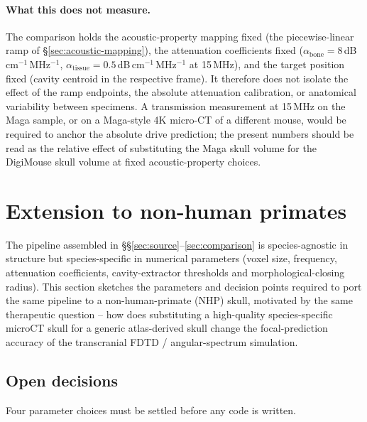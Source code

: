 \documentclass{compactarticle}
\begin{document}
\paragraph{What this does not measure.} The comparison holds the
acoustic-property mapping fixed (the piecewise-linear ramp of
\S\ref{sec:acoustic-mapping}), the attenuation coefficients fixed
($\alpha_{\mathrm{bone}} = 8$\,dB\,cm$^{-1}$\,MHz$^{-1}$,
$\alpha_{\mathrm{tissue}} = 0.5$\,dB\,cm$^{-1}$\,MHz$^{-1}$ at
15\,MHz), and the target position fixed (cavity centroid in the
respective frame). It therefore does not isolate the effect of the
ramp endpoints, the absolute attenuation calibration, or anatomical
variability between specimens. A transmission measurement at 15\,MHz
on the Maga sample, or on a Maga-style 4K micro-CT of a different
mouse, would be required to anchor the absolute drive prediction; the
present numbers should be read as the relative effect of substituting
the Maga skull volume for the DigiMouse skull volume at fixed
acoustic-property choices.


\section{Extension to non-human primates}
\label{sec:nhp}

The pipeline assembled in
\S\S\ref{sec:source}--\ref{sec:comparison} is species-agnostic in
structure but species-specific in numerical parameters (voxel size,
frequency, attenuation coefficients, cavity-extractor thresholds and
morphological-closing radius). This section sketches the parameters
and decision points required to port the same pipeline to a
non-human-primate (NHP) skull, motivated by the same therapeutic
question -- how does substituting a high-quality species-specific
microCT skull for a generic atlas-derived skull change the
focal-prediction accuracy of the transcranial FDTD /
angular-spectrum simulation.

\subsection*{Open decisions}

Four parameter choices must be settled before any code is written.
\end{document}
